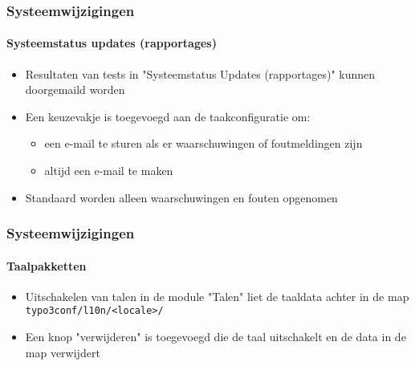 \begin{frame}[fragile]
	\frametitle{Systeemwijzigingen}
	\framesubtitle{Systeemstatus updates (rapportages)}

	\begin{itemize}
		\item Resultaten van tests in "Systeemstatus Updates (rapportages)" kunnen doorgemaild worden
		\item Een keuzevakje is toegevoegd aan de taakconfiguratie om:

			\begin{itemize}
				\item een e-mail te sturen als er waarschuwingen of foutmeldingen zijn
				\item altijd een e-mail te maken
			\end{itemize}

		\item Standaard worden alleen waarschuwingen en fouten opgenomen

	\end{itemize}

\end{frame}







\begin{frame}[fragile]
	\frametitle{Systeemwijzigingen}
	\framesubtitle{Taalpakketten}

	\begin{itemize}
		\item Uitschakelen van talen in de module "Talen" liet de taaldata achter
			in de map \texttt{typo3conf/l10n/<locale>/}
		\item Een knop "verwijderen" is toegevoegd die de taal uitschakelt en de data
		 	in de map verwijdert
	\end{itemize}

\end{frame}








